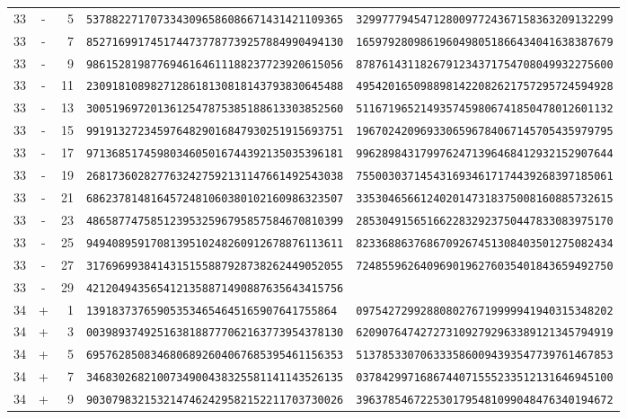 \begin{longtable}{@{}rcrll@{}}
33&-&5&\texttt{5378822717073343096586086671431421109365}&\texttt{3299777945471280097724367158363209132299}\\
33&-&7&\texttt{8527169917451744737787739257884990494130}&\texttt{1659792809861960498051866434041638387679}\\
33&-&9&\texttt{9861528198776946164611188237723920615056}&\texttt{8787614311826791234371754708049932275600}\\
33&-&11&\texttt{2309181089827128618130818143793830645488}&\texttt{4954201650988981422082621757295724594928}\\
33&-&13&\texttt{3005196972013612547875385188613303852560}&\texttt{5116719652149357459806741850478012601132}\\
33&-&15&\texttt{9919132723459764829016847930251915693751}&\texttt{1967024209693306596784067145705435979795}\\
33&-&17&\texttt{9713685174598034605016744392135035396181}&\texttt{9962898431799762471396468412932152907644}\\
33&-&19&\texttt{2681736028277632427592131147661492543038}&\texttt{7550030371454316934617174439268397185061}\\
33&-&21&\texttt{6862378148164572481060380102160986323507}&\texttt{3353046566124020147318375008160885732615}\\
33&-&23&\texttt{4865877475851239532596795857584670810399}&\texttt{2853049156516622832923750447833083975170}\\
33&-&25&\texttt{9494089591708139510248260912678876113611}&\texttt{8233688637686709267451308403501275082434}\\
33&-&27&\texttt{3176969938414315155887928738262449052055}&\texttt{7248559626409690196276035401843659492750}\\
33&-&29&\texttt{4212049435654121358871490887635643415756}&\texttt{}\\
34&+&1&\texttt{139183737659053534654645165907641755864}&\texttt{0975427299288080276719999941940315348202}\\
34&+&3&\texttt{0039893749251638188777062163773954378130}&\texttt{6209076474272731092792963389121345794919}\\
34&+&5&\texttt{6957628508346806892604067685395461156353}&\texttt{5137853307063335860094393547739761467853}\\
34&+&7&\texttt{3468302682100734900438325581141143526135}&\texttt{0378429971686744071555233512131646945100}\\
34&+&9&\texttt{9030798321532147462429582152211703730026}&\texttt{3963785467225301795481099048476340194672}\\

\end{longtable}
